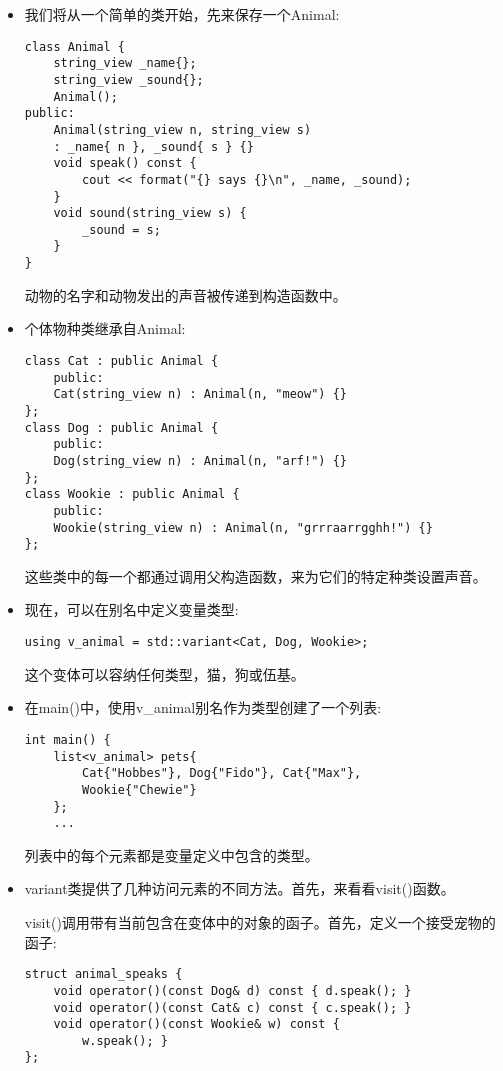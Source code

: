 \begin{itemize}
\item 
我们将从一个简单的类开始，先来保存一个Animal:

\begin{lstlisting}[style=styleCXX]
class Animal {
	string_view _name{};
	string_view _sound{};
	Animal();
public:
	Animal(string_view n, string_view s)
	: _name{ n }, _sound{ s } {}
	void speak() const {
		cout << format("{} says {}\n", _name, _sound);
	}
	void sound(string_view s) {
		_sound = s;
	}
}
\end{lstlisting}

动物的名字和动物发出的声音被传递到构造函数中。

\item 
个体物种类继承自Animal:

\begin{lstlisting}[style=styleCXX]
class Cat : public Animal {
	public:
	Cat(string_view n) : Animal(n, "meow") {}
};
class Dog : public Animal {
	public:
	Dog(string_view n) : Animal(n, "arf!") {}
};
class Wookie : public Animal {
	public:
	Wookie(string_view n) : Animal(n, "grrraarrgghh!") {}
};
\end{lstlisting}

这些类中的每一个都通过调用父构造函数，来为它们的特定种类设置声音。

\item 
现在，可以在别名中定义变量类型:

\begin{lstlisting}[style=styleCXX]
using v_animal = std::variant<Cat, Dog, Wookie>;
\end{lstlisting}

这个变体可以容纳任何类型，猫，狗或伍基。

\item 
在main()中，使用v\_animal别名作为类型创建了一个列表:

\begin{lstlisting}[style=styleCXX]
int main() {
	list<v_animal> pets{
		Cat{"Hobbes"}, Dog{"Fido"}, Cat{"Max"},
		Wookie{"Chewie"}
	};
	...
\end{lstlisting}

列表中的每个元素都是变量定义中包含的类型。

\item 
variant类提供了几种访问元素的不同方法。首先，来看看visit()函数。

visit()调用带有当前包含在变体中的对象的函子。首先，定义一个接受宠物的函子:

\begin{lstlisting}[style=styleCXX]
struct animal_speaks {
	void operator()(const Dog& d) const { d.speak(); }
	void operator()(const Cat& c) const { c.speak(); }
	void operator()(const Wookie& w) const {
		w.speak(); }
};
\end{lstlisting}


\end{itemize}
